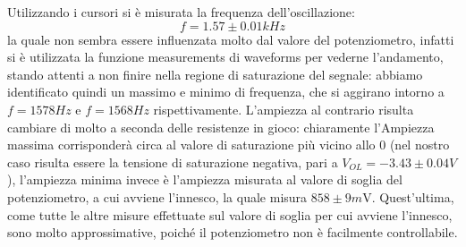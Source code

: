 \documentclass[10pt, a4paper, italian]{article}
\begin{document}
Utilizzando i cursori si è misurata la frequenza dell'oscillazione:
\[
f=1.57 \pm 0.01 \si{kHz}
\]
la quale non sembra essere influenzata molto dal valore del potenziometro, infatti si è utilizzata la funzione measurements di waveforms per vederne l'andamento, stando attenti a non finire nella regione di saturazione del segnale: abbiamo identificato quindi un massimo e minimo di frequenza, che si aggirano intorno a $f= 1578 Hz$ e $f= 1568 Hz$ rispettivamente. L'ampiezza al contrario risulta cambiare di molto a seconda delle resistenze in gioco: chiaramente l'Ampiezza massima corrisponderà circa al valore di saturazione più vicino allo 0 (nel nostro caso risulta essere la tensione di saturazione negativa, pari a $V_{OL}=-3.43 \pm 0.04 V$), l'ampiezza minima invece è l'ampiezza misurata al valore di soglia del potenziometro, a cui avviene l'innesco, la quale misura $858 \pm 9 \si{m\V}$. Quest'ultima, come tutte le altre misure effettuate sul valore di soglia per cui avviene l'innesco, sono molto approssimative, poiché il potenziometro non è facilmente controllabile.
\end{document}
